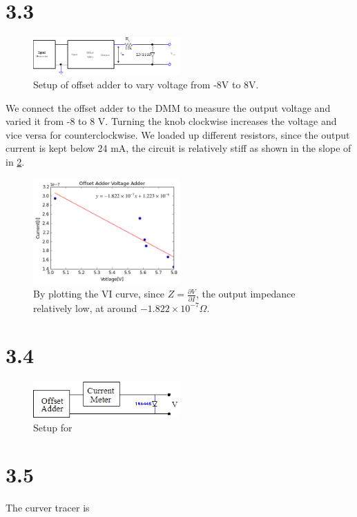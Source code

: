 \documentclass[authoryear, 12pt,5p, times]{elsarticle}
\begin{document}
\section*{3.3}
\begin{figure}[h!]
\center
\includegraphics[width=0.5\textwidth]{figure/3_3_setup}
\caption{Setup of offset adder to vary voltage from -8V to 8V.}
\label{3_3}
\end{figure}
We connect the offset adder to the DMM to measure the output voltage and varied it from -8 to 8 V. Turning the knob clockwise increases the voltage and vice versa for counterclockwise. We loaded up different resistors, since the output current is kept below 24 mA, the circuit is relatively stiff as shown in the slope of in \ref{3_3}. 
\begin{figure}[h!]
\center
\includegraphics[width=0.5\textwidth]{figure/3_3}
\caption{By plotting the VI curve, since $Z=\frac{\partial V}{\partial I}$, the output  impedance relatively low, at around $-1.822\times10^{-7} \Omega$.}
\label{3_3}
\end{figure}
\section*{3.4}
\begin{figure}[h!]
\center
\includegraphics[width=0.5\textwidth]{figure/3_4_diag}
\caption{Setup for }
\label{3_4_diag}
\end{figure}
\section*{3.5}
The curver tracer is  
\end{document}
